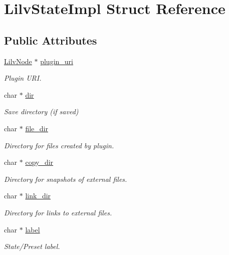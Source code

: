 \hypertarget{struct_lilv_state_impl}{}\section{Lilv\+State\+Impl Struct Reference}
\label{struct_lilv_state_impl}
\subsection*{Public Attributes}
\begin{DoxyCompactItemize}
\item 
\hyperlink{lilv_8h_ae183dca3dca5368d34dbd863a405437b}{Lilv\+Node} $\ast$ \hyperlink{struct_lilv_state_impl_a97a4d9bd654fd4933145fce964838687}{plugin\+\_\+uri}
\begin{DoxyCompactList}\small\item\em Plugin U\+RI. \end{DoxyCompactList}\item 
char $\ast$ \hyperlink{struct_lilv_state_impl_a77d1235d86cbe387065c1f6b28e695ea}{dir}
\begin{DoxyCompactList}\small\item\em Save directory (if saved) \end{DoxyCompactList}\item 
char $\ast$ \hyperlink{struct_lilv_state_impl_aca646616a6799ac3dd9d72fcf246cba3}{file\+\_\+dir}
\begin{DoxyCompactList}\small\item\em Directory for files created by plugin. \end{DoxyCompactList}\item 
char $\ast$ \hyperlink{struct_lilv_state_impl_a92a6b22fb006586f698c99c1d3b72459}{copy\+\_\+dir}
\begin{DoxyCompactList}\small\item\em Directory for snapshots of external files. \end{DoxyCompactList}\item 
char $\ast$ \hyperlink{struct_lilv_state_impl_a7ddc78d3d2e8ab2cd72f339c65e219dc}{link\+\_\+dir}
\begin{DoxyCompactList}\small\item\em Directory for links to external files. \end{DoxyCompactList}\item 
char $\ast$ \hyperlink{struct_lilv_state_impl_a34aa18d3cec23640abf47af7889aea44}{label}
\begin{DoxyCompactList}\small\item\em State/\+Preset label. \end{DoxyCompactList}\item 

\end{DoxyCompactItemize}
